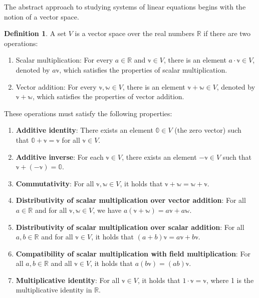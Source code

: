 \documentclass[
]{book}
\theoremstyle{definition}
\newtheorem{definition}{Definition}[chapter]
\theoremstyle{definition}
\theoremstyle{definition}
\theoremstyle{definition}
\theoremstyle{remark}
\begin{document}
The abstract approach to studying systems of linear equations begins with the notion of a vector space.

\begin{definition}

A set \(V\) is a vector space over the real numbers \(\mathbb{R}\) if there are two operations:

\begin{enumerate}
\def\labelenumi{\arabic{enumi}.}
\item
  Scalar multiplication: For every \(a \in \mathbb{R}\) and \(\mathbb{v} \in V\), there is an element \(a \cdot \mathbb{v} \in V\), denoted by \(a \mathbb{v}\), which satisfies the properties of scalar multiplication.
\item
  Vector addition: For every \(\mathbb{v}, \mathbb{w} \in V\), there is an element \(\mathbb{v} + \mathbb{w} \in V\), denoted by \(\mathbb{v} + \mathbb{w}\), which satisfies the properties of vector addition.
\end{enumerate}

These operations must satisfy the following properties:

\begin{enumerate}
\def\labelenumi{\alph{enumi})}
\item
  \textbf{Additive identity}: There exists an element \(\mathbb{0} \in V\) (the zero vector) such that \(\mathbb{0} + \mathbb{v} = \mathbb{v}\) for all \(\mathbb{v} \in V\).
\item
  \textbf{Additive inverse}: For each \(\mathbb{v} \in V\), there exists an element \(-\mathbb{v} \in V\) such that \(\mathbb{v} + (-\mathbb{v}) = \mathbb{0}\).
\item
  \textbf{Commutativity}: For all \(\mathbb{v}, \mathbb{w} \in V\), it holds that \(\mathbb{v} + \mathbb{w} = \mathbb{w} + \mathbb{v}\).
\item
  \textbf{Distributivity of scalar multiplication over vector addition}: For all \(a \in \mathbb{R}\) and for all \(\mathbb{v}, \mathbb{w} \in V\), we have \(a(\mathbb{v} + \mathbb{w}) = a\mathbb{v} + a\mathbb{w}\).
\item
  \textbf{Distributivity of scalar multiplication over scalar addition}: For all \(a, b \in \mathbb{R}\) and for all \(\mathbb{v} \in V\), it holds that \((a + b)\mathbb{v} = a\mathbb{v} + b\mathbb{v}\).
\item
  \textbf{Compatibility of scalar multiplication with field multiplication}: For all \(a, b \in \mathbb{R}\) and all \(\mathbb{v} \in V\), it holds that \(a(b\mathbb{v}) = (ab)\mathbb{v}\).
\item
  \textbf{Multiplicative identity}: For all \(\mathbb{v} \in V\), it holds that \(1 \cdot \mathbb{v} = \mathbb{v}\), where 1 is the multiplicative identity in \(\mathbb{R}\).
\end{enumerate}

\end{definition}
\end{document}
